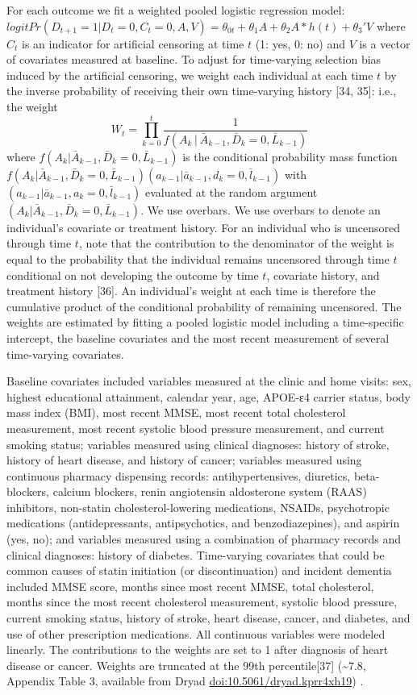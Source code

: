 \documentclass[
]{book}
\begin{document}
For each outcome we fit a weighted pooled logistic regression model: \(logitPr(D_{t+1} = 1|D_t = 0, C_t = 0, A, V) = \theta_{0t} + \theta_{1}A + \theta_{2}A * h(t) + \theta_{3}'V\) where \(C_t\) is an indicator for artificial censoring at time \(t\) (1: yes, 0: no) and \(V\) is a vector of covariates measured at baseline. To adjust for time-varying selection bias induced by the artificial censoring, we weight each individual at each time \(t\) by the inverse probability of receiving their own time-varying history {[}34, 35{]}: i.e., the weight \[W_{t} = \prod_{k=0}^{t} \frac{1}{f(A_{k}│\bar{A}_{k-1}, \bar{D}_{k} = 0, \bar{L}_{k-1})}\] where \(f(A_{k}|\bar{A}_{k-1},\bar{D}_{k} = 0, \bar{L}_{k-1})\) is the conditional probability mass function \(f(A_{k}|\bar{A}_{k-1},\bar{D}_{k} = 0, \bar{L}_{k-1})(a_{k-1}|\bar{a}_{k-1}, d_k = 0, \bar{l}_{k-1})\) with \((a_{k-1}|\bar{a}_{k-1}, a_k = 0, \bar{l}_{k-1})\) evaluated at the random argument \((A_{k}|\bar{A}_{k-1},\bar{D}_{k} = 0, \bar{L}_{k-1})\). We use overbars. We use overbars to denote an individual's covariate or treatment history. For an individual who is uncensored through time \(t\), note that the contribution to the denominator of the weight is equal to the probability that the individual remains uncensored through time \(t\) conditional on not developing the outcome by time \(t\), covariate history, and treatment history {[}36{]}. An individual's weight at each time is therefore the cumulative product of the conditional probability of remaining uncensored. The weights are estimated by fitting a pooled logistic model including a time-specific intercept, the baseline covariates and the most recent measurement of several time-varying covariates.

Baseline covariates included variables measured at the clinic and home visits: sex, highest educational attainment, calendar year, age, APOE-ε4 carrier status, body mass index (BMI), most recent MMSE, most recent total cholesterol measurement, most recent systolic blood pressure measurement, and current smoking status; variables measured using clinical diagnoses: history of stroke, history of heart disease, and history of cancer; variables measured using continuous pharmacy dispensing records: antihypertensives, diuretics, beta-blockers, calcium blockers, renin angiotensin aldosterone system (RAAS) inhibitors, non-statin cholesterol-lowering medications, NSAIDs, psychotropic medications (antidepressants, antipsychotics, and benzodiazepines), and aspirin (yes, no); and variables measured using a combination of pharmacy records and clinical diagnoses: history of diabetes. Time-varying covariates that could be common causes of statin initiation (or discontinuation) and incident dementia included MMSE score, months since most recent MMSE, total cholesterol, months since the most recent cholesterol measurement, systolic blood pressure, current smoking status, history of stroke, heart disease, cancer, and diabetes, and use of other prescription medications. All continuous variables were modeled linearly. The contributions to the weights are set to 1 after diagnosis of heart disease or cancer. Weights are truncated at the 99th percentile{[}37{]} (\textasciitilde7.8, Appendix Table 3, available from Dryad \url{doi:10.5061/dryad.kprr4xh19}) .
\end{document}
